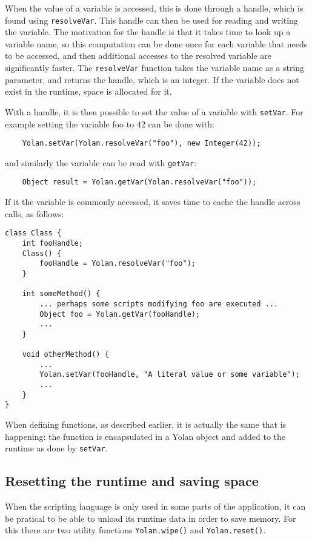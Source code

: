 \documentclass[11pt]{report}
\begin{document}
When the value of a variable is accessed, this is done through a handle, which is found using \verb|resolveVar|. This handle can then be used for reading and writing the variable. The motivation for the handle is that it takes time to look up a variable name, so this computation can be done once for each variable that needs to be accessed, and then additional accesses to the resolved variable are significantly faster. The \verb|resolveVar| function takes the variable name as a string parameter, and returns the handle, which is an integer. If the variable does not exist in the runtime, space is allocated for it.

With a handle, it is then possible to set the value of a variable with \verb|setVar|. For example setting the variable foo to 42 can be done with:
\begin{lstlisting}
    Yolan.setVar(Yolan.resolveVar("foo"), new Integer(42));
\end{lstlisting} 
and similarly the variable can be read with \verb|getVar|:
\begin{lstlisting}
    Object result = Yolan.getVar(Yolan.resolveVar("foo"));
\end{lstlisting}

If it the variable is commonly accessed, it saves time to cache the handle across calls, as follows:
\begin{lstlisting}
class Class {
    int fooHandle;
    Class() {
        fooHandle = Yolan.resolveVar("foo");
    }

    int someMethod() {
        ... perhaps some scripts modifying foo are executed ...
        Object foo = Yolan.getVar(fooHandle);
        ...
    }

    void otherMethod() {
        ... 
        Yolan.setVar(fooHandle, "A literal value or some variable");
        ...
    }
}
\end{lstlisting}
When defining functions, as described earlier, it is actually the same that is happening: the function is encapsulated in a Yolan object and added to the runtime as done by \verb|setVar|.

\subsection{Resetting the runtime and saving space}
When the scripting language is only used in some parts of the application, it can be pratical to be able to unload its runtime data in order to save memory. 
For this there are two utility functions \verb|Yolan.wipe()| and \verb|Yolan.reset()|.
\end{document}
